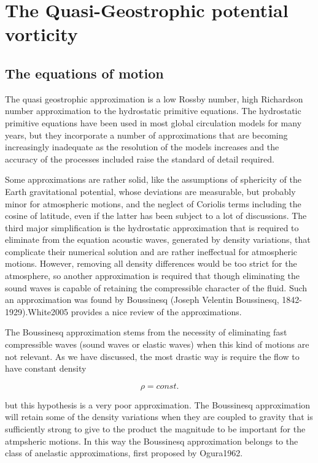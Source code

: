 \section{The Quasi-Geostrophic potential
vorticity}\label{the-quasi-geostrophic-potential-vorticity}

\subsection{The equations of motion}\label{the-equations-of-motion}

The quasi geostrophic approximation is a low Rossby number, high
Richardson number approximation to the hydrostatic primitive equations.
The hydrostatic primitive equations have been used in most global
circulation models for many years, but they incorporate a number of
approximations that are becoming increasingly inadequate as the
resolution of the models increases and the accuracy of the processes
included raise the standard of detail required.

Some approximations are rather solid, like the assumptions of sphericity
of the Earth gravitational potential, whose deviations are measurable,
but probably minor for atmospheric motions, and the neglect of Coriolis
terms including the cosine of latitude, even if the latter has been
subject to a lot of discussions. The third major simplification is the
hydrostatic approximation that is required to eliminate from the
equation acoustic waves, generated by density variations, that
complicate their numerical solution and are rather ineffectual for
atmospheric motions. However, removing all density differences would be
too strict for the atmosphere, so another approximation is required that
though eliminating the sound waves is capable of retaining the
compressible character of the fluid. Such an approximation was found by
Boussinesq (Joseph Velentin Boussinesq, 1842-1929).White2005 provides a
nice review of the approximations.

The Boussinesq approximation stems from the necessity of eliminating
fast compressible waves (sound waves or elastic waves) when this kind of
motions are not relevant. As we have discussed, the most drastic way is
require the flow to have constant density

\[\rho = const.\]

but this hypothesis is a very poor approximation. The Boussinesq
approximation will retain some of the density variations when they are
coupled to gravity that is sufficiently strong to give to the product
the magnitude to be important for the atmpsheric motions. In this way
the Boussinesq approximation belongs to the class of anelastic
approximations, first proposed by Ogura1962.

